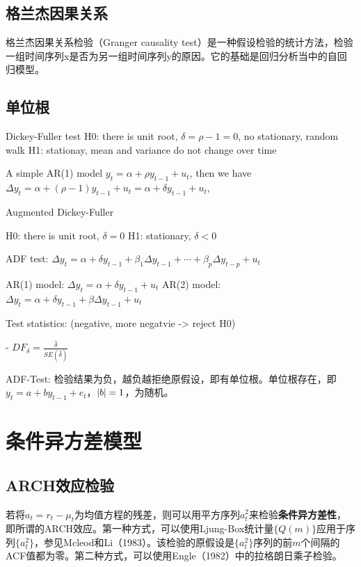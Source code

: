 \documentclass[11pt]{article}
\begin{document}
\subsection{格兰杰因果关系}

格兰杰因果关系检验（Granger causality test）是一种假设检验的统计方法，检验一组时间序列x是否为另一组时间序列y的原因。它的基础是回归分析当中的自回归模型。


\subsection{单位根}

Dickey-Fuller test
H0: there is unit root, $\delta = \rho - 1 =0$, no stationary, random walk
H1: stationay, mean and variance do not change over time

A simple AR(1) model $y_t = \alpha + \rho y_{t-1} + u_t$, then we have $\Delta y_t = \alpha + (\rho -1) y_{t-1} + u_t = \alpha + \delta y_{t-1} + u_t$, 

Augmented Dickey-Fuller 

H0: there is unit root, $\delta = 0$
H1: stationary, $\delta < 0$

ADF test: $\Delta y_t = \alpha + \delta y_{t-1} + \beta_1 \Delta y_{t-1} + \cdots + \beta_{p} \Delta y_{t-p} + u_t$

AR(1) model: $\Delta y_t = \alpha + \delta y_{t-1} + u_t$
AR(2) model: $\Delta y_t = \alpha + \delta y_{t-1} + \beta \Delta y_{t-1} + u_t$

Test statistics: (negative, more negatvie -> reject H0)

-  $DF_{\delta} = \frac{\hat{\delta}}{SE(\hat{\delta})}$

ADF-Test: 检验结果为负，越负越拒绝原假设，即有单位根。单位根存在，即$y_t = a + b y_{t-1} + e_t$，$\left\lvert b\right\rvert =1$，为随机。

\section{条件异方差模型}

\subsection{ARCH效应检验}

若将$a_t = r_t - \mu_t$为均值方程的残差，则可以用平方序列$a_t^2$来检验\textbf{条件异方差性}，即所谓的ARCH效应。第一种方式，可以使用Ljung-Box统计量$\{Q(m)\}$应用于序列$\{a_t^2\}$，参见Mcleod和Li（1983）。该检验的原假设是$\{a_t^2\}$序列的前$m$个间隔的ACF值都为零。第二种方式，可以使用Engle（1982）中的拉格朗日乘子检验。
\end{document}
